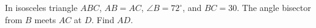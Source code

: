 In isosceles triangle $ABC$, $AB=AC$, $\angle B=72^\circ$, and $BC=30$. The angle bisector from $B$ meets $AC$ at $D$. Find $AD$.
